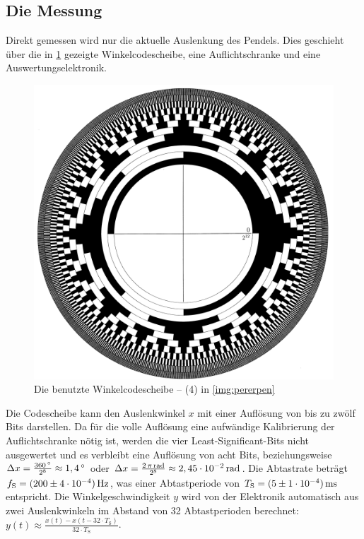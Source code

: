 \documentclass[numbers=noenddot,12pt,a4paper]{scrartcl}
\newcommand{\degree}{^\circ}
\newcommand{\tenpo}[1]{\cdot 10^{#1}}
\newcommand{\ix}[1]{_\text{#1}}
\begin{document}
\subsection{Die Messung}\label{ch2.2}
Direkt gemessen wird nur die aktuelle Auslenkung des Pendels. Dies geschieht über die in \ref{img:wicosch} gezeigte Winkelcodescheibe, eine Auflichtschranke und eine Auswertungselektronik.
\begin{figure}[H]
	\centering
	\includegraphics[width=\textwidth]{winkelcodescheibe.png}
	\caption{Die benutzte Winkelcodescheibe -- (4) in \ref{img:pererpen}}
	\label{img:wicosch}
\end{figure}
Die Codescheibe kann den Auslenkwinkel $x$ mit einer Auflösung von bis zu zwölf Bits darstellen. Da für die volle Auflösung eine aufwändige Kalibrierung der Auflichtschranke nötig ist, werden die vier Least-Significant-Bits nicht ausgewertet und es verbleibt eine Auflösung von acht Bits, beziehungsweise $\Delta x=\frac{\unit[360]{\degree}}{2^8}\approx\unit[1,4]{\degree}$ oder $\Delta x=\frac{\unit[2\,\pi]{rad}}{2^8}\approx\unit[2,45\tenpo{-2}]{rad}$. Die Abtastrate beträgt $f\ix{S}=\unit[(200\pm4\tenpo{-4})]{Hz}$, was einer Abtastperiode von $T\ix{S}=\unit[(5\pm1\tenpo{-4})]{ms}$ entspricht. Die Winkelgeschwindigkeit $y$ wird von der Elektronik automatisch aus zwei Auslenkwinkeln im Abstand von 32 Abtastperioden berechnet: $y(t)\approx\frac{x(t)-x(t-32\cdot T\ix{S})}{32\cdot T\ix{S}}$.\\
\end{document}
